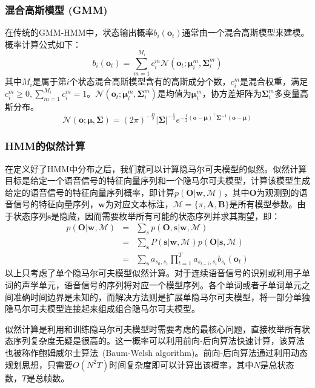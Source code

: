 \subsubsection{混合高斯模型 (GMM)}
在传统的GMM-HMM中，状态输出概率$b_i(\mathbf{o}_t)$通常由一个混合高斯模型来建模。概率计算公式如下：
\begin{equation}
    b_i(\mathbf{o}_t)=\sum_{m=1}^{M_i}c^m_{i}\mathcal{N}(\mathbf{o}_t;\bm{\mu}^m_{i},\bm{\Sigma}^m_{i})
\end{equation}
其中$M_i$是属于第$i$个状态混合高斯模型含有的高斯成分个数，$c^m_{i}$是混合权重，满足$c^m_{i} \ge 0, \sum_{m=1}^{M_i} c^m_{i}=1$。$\mathcal{N}(\mathbf{o}_t;\bm{\mu}^m_{i},\bm{\Sigma}^m_{i})$是均值为$\bm{\mu}^m_{i}$，协方差矩阵为$\bm{\Sigma}^m_{i}$多变量高斯分布。
\begin{equation}
    \mathcal{N}(\mathbf{o};\bm{\mu},\bm{\Sigma})=(2\pi)^{-\frac{D}{2}}{|\bm{\Sigma}|}^{-\frac{1}{2}}e^{-\frac{1}{2}(\mathbf{o}-\bm{\mu})^{\top}\bm{\Sigma}^{-1}(\mathbf{o}-\bm{\mu})}
\end{equation}

\subsubsection{HMM的似然计算}
\label{sec:calc_like}
在定义好了HMM中分布之后，我们就可以计算隐马尔可夫模型的似然。似然计算目标是给定一个语音信号的特征向量序列和一个隐马尔可夫模型，计算该模型生成给定的语音信号的特征向量序列概率，即计算$p(\mathbf{O}|\mathbf{w},\mathcal{M})$，其中$\mathbf{O}$为观测到的语音信号的特征向量序列，$\mathbf{w}$为对应文本标注，$\mathcal{M}=\{\pi, \mathbf{A}, \mathbf{B}\}$是所有模型参数。由于状态序列$\mathbf{s}$是隐藏，因而需要枚举所有可能的状态序列并求其期望，即：
\begin{eqnarray}
p(\mathbf{O}|\mathbf{w},\mathcal{M}) &=& \sum_{s}p(\mathbf{O},\mathbf{s}|\mathbf{w},\mathcal{M}) \\
&=& \sum_{\mathbf{s}} P(\mathbf{s}|\mathbf{w},\mathcal{M})p(\mathbf{O}|\mathbf{s},\mathcal{M}) \\
&=& \sum_{\mathbf{s}} a_{s_0, s_1}\prod_{t=1}^T a_{s_{t-1}, s_t}b_{s_t}(\mathbf{o}_t)
\end{eqnarray}
以上只考虑了单个隐马尔可夫模型似然计算。对于连续语音信号的识别或利用子单词的声学单元，语音信号的序列将对应一个模型序列。各个单词或者子单词单元之间准确时间边界是未知的，而解决方法则是扩展单隐马尔可夫模型，将一部分单独隐马尔可夫模型连接起来组成组合隐马尔可夫模型。

似然计算是利用和训练隐马尔可夫模型时需要考虑的最核心问题，直接枚举所有状态序列复杂度无疑是很高的。这一概率可以利用前向-后向算法快速计算，该算法也被称作鲍姆威尔士算法~\cite{baum1967inequality}(Baum-Welsh algorithm)。前向-后向算法通过利用动态规划思想，只需要$O(N^2T)$时间复杂度即可以计算出该概率，其中$N$是总状态数，$T$是总帧数。

